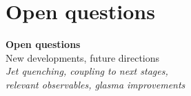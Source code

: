 \documentclass[aspectratio=169,11pt,usenames,dvipsnames]{beamer}
\renewcommand{\thefootnote}{\color{customblue}\faPaperPlaneO}
\newcommand\blfootnote[1]{%
  \begingroup
  \renewcommand\thefootnote{}\footnote{#1}%
  \addtocounter{footnote}{-1}%
  \endgroup
}
\begin{document}




\section{Open questions}

\begin{frame}{}
    \begin{center}
        \vspace{1cm}
        {\huge\color{jyured}\bfseries Open questions}\\[0.4cm]
        {\Large\color{normal} New developments, future directions}\\[0.4cm]
        {\large\textit{Jet quenching, coupling to next stages,\\relevant observables, glasma improvements}}
    \end{center}
\end{frame}

\end{document}
